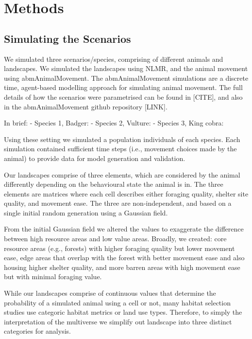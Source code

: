 \documentclass[10pt,a4paper]{article}
\begin{document}
\hypertarget{methods}{%
\section{Methods}\label{methods}}

\hypertarget{simulating-the-scenarios}{%
\subsection{Simulating the Scenarios}\label{simulating-the-scenarios}}

We simulated three scenarios/species, comprising of different animals and landscapes.
We simulated the landscapes using NLMR, and the animal movement using abmAnimalMovement.
The abmAnimalMovement simulations are a discrete time, agent-based modelling approach for simulating animal movement.
The full details of how the scenarios were parametrised can be found in {[}CITE{]}, and also in the abmAnimalMovement github repository {[}LINK{]}.

In brief:
- Species 1, Badger:
- Species 2, Vulture:
- Species 3, King cobra:

Using these setting we simulated a population individuals of each species.
Each simulation contained sufficient time steps (i.e., movement choices made by the animal) to provide data for model generation and validation.

Our landscapes comprise of three elements, which are considered by the animal differently depending on the behavioural state the animal is in.
The three elements are matrices where each cell describes either foraging quality, shelter site quality, and movement ease.
The three are non-independent, and based on a single initial random generation using a Gaussian field.

From the initial Gaussian field we altered the values to exaggerate the difference between high resource areas and low value areas.
Broadly, we created: core resource areas (e.g., forests) with higher foraging quality but lower movement ease, edge areas that overlap with the forest with better movement ease and also housing higher shelter quality, and more barren areas with high movement ease but with minimal foraging value.

While our landscapes comprise of continuous values that determine the probability of a simulated animal using a cell or not, many habitat selection studies use categoric habitat metrics or land use types.
Therefore, to simply the interpretation of the multiverse we simplify out landscape into three distinct categories for analysis.
\end{document}
